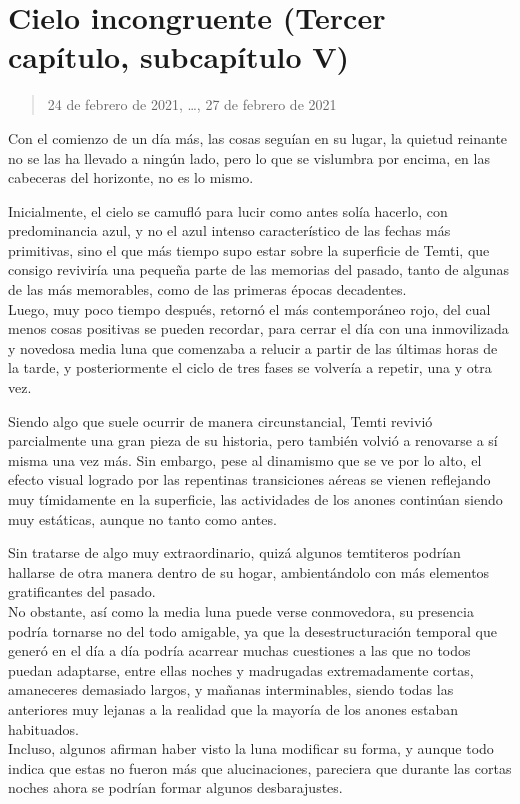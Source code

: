 \documentclass[
  spanish,
]{book}
\begin{document}
\hypertarget{cielo-incongruente-tercer-capuxedtulo-subcapuxedtulo-v}{%
\section{Cielo incongruente (Tercer capítulo, subcapítulo V)}\label{cielo-incongruente-tercer-capuxedtulo-subcapuxedtulo-v}}

\begin{quote}
24 de febrero de 2021, \ldots, 27 de febrero de 2021
\end{quote}

Con el comienzo de un día más, las cosas seguían en su lugar, la quietud reinante no se las ha llevado a ningún lado, pero lo que se vislumbra por encima, en las cabeceras del horizonte, no es lo mismo.

Inicialmente, el cielo se camufló para lucir como antes solía hacerlo, con predominancia azul, y no el azul intenso característico de las fechas más primitivas, sino el que más tiempo supo estar sobre la superficie de Temti, que consigo reviviría una pequeña parte de las memorias del pasado, tanto de algunas de las más memorables, como de las primeras épocas decadentes.\\
Luego, muy poco tiempo después, retornó el más contemporáneo rojo, del cual menos cosas positivas se pueden recordar, para cerrar el día con una inmovilizada y novedosa media luna que comenzaba a relucir a partir de las últimas horas de la tarde, y posteriormente el ciclo de tres fases se volvería a repetir, una y otra vez.

Siendo algo que suele ocurrir de manera circunstancial, Temti revivió parcialmente una gran pieza de su historia, pero también volvió a renovarse a sí misma una vez más. Sin embargo, pese al dinamismo que se ve por lo alto, el efecto visual logrado por las repentinas transiciones aéreas se vienen reflejando muy tímidamente en la superficie, las actividades de los anones continúan siendo muy estáticas, aunque no tanto como antes.

Sin tratarse de algo muy extraordinario, quizá algunos temtiteros podrían hallarse de otra manera dentro de su hogar, ambientándolo con más elementos gratificantes del pasado.\\
No obstante, así como la media luna puede verse conmovedora, su presencia podría tornarse no del todo amigable, ya que la desestructuración temporal que generó en el día a día podría acarrear muchas cuestiones a las que no todos puedan adaptarse, entre ellas noches y madrugadas extremadamente cortas, amaneceres demasiado largos, y mañanas interminables, siendo todas las anteriores muy lejanas a la realidad que la mayoría de los anones estaban habituados.\\
Incluso, algunos afirman haber visto la luna modificar su forma, y aunque todo indica que estas no fueron más que alucinaciones, pareciera que durante las cortas noches ahora se podrían formar algunos desbarajustes.
\end{document}
